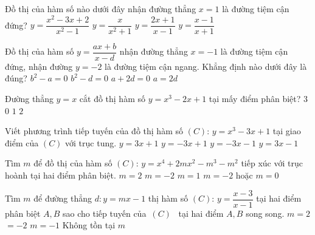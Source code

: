 \begin{ex}%
	Đồ thị của hàm số nào dưới đây nhận đường thẳng $x=1$ là đường tiệm cận đứng?
	\choice
	{$y=\dfrac{x^2-3x+2}{x^2-1}$}
	{$y=\dfrac{x}{x^2+1}$}
	{\True $y=\dfrac{2x+1}{x-1}$}
	{$y=\dfrac{x-1}{x+1}$}
\end{ex}

\begin{ex}%
	Đồ thị của hàm số $y=\dfrac{ax+b}{x-d}$ nhận đường thẳng $x=-1$ là đường tiệm cận đứng, nhận đường $y=-2$ là đường tiệm cận ngang. Khẳng định nào dưới đây là đúng?
	\choice
	{$b^2-a=0$}
	{$b^2-d=0$}
	{$a+2d=0$}
	{\True $a=2d$}
\end{ex}

\begin{ex}%
	Đường thẳng $y=x$ cắt đồ thị hàm số $y=x^3-2x+1$ tại mấy điểm phân biệt?
	\choice
	{\True $3$}
	{$0$}
	{$1$}
	{$2$}
\end{ex}

\begin{ex}%
	Viết phương trình tiếp tuyến của  đồ thị hàm số $(C)$: $y=x^3-3x+1$ tại giao điểm của $(C)$ với trục tung.
	\choice
	{$y=3x+1$}
	{\True $y=-3x+1$}
	{$y=-3x-1$}
	{$y=3x-1$}
\end{ex}

\begin{ex}%
	Tìm $m$ để đồ thị của  hàm số $(C)$: $y=x^4+2mx^2-m^3-m^2$ tiếp xúc với trục hoành tại hai điểm phân biệt.
	\choice
	{$m=2$}
	{\True $m=-2$}
	{$m=1$}
	{$m=-2$ hoặc $m=0$}
\end{ex}

\begin{ex}%
	Tìm $m$ để đường thẳng $d:y=mx-1$ thị hàm số $(C)$: $y=\dfrac{x-3}{x-1}$ tại hai điểm phân biệt $A, B$ sao cho tiếp tuyến của\ $(C)$ \ tại hai điểm $A, B$ song song.
	\choice
	{$m=2$}
	{$=-2$}
	{$m=-1$}
	{\True Không tồn tại $m$}
\end{ex}


